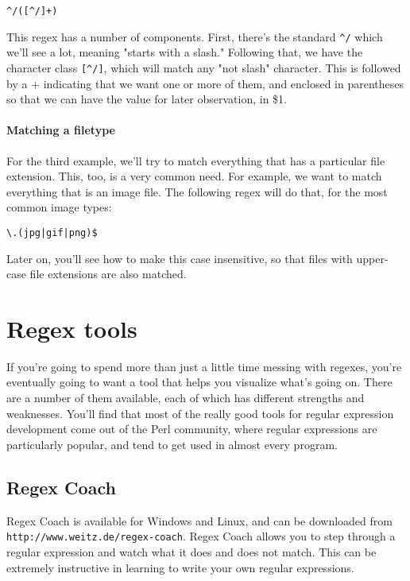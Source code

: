 \verb=^/([^/]+)=

This regex has a number of components. First, there's the standard \verb=^/= which we'll see a 
lot, meaning "starts with a slash." Following that, we have the character class \verb=[^/]=, which will 
match any "not slash" character. This is followed by a + indicating that we want one or more 
of them, and enclosed in parentheses so that we can have the value for later observation, in 
\$1.

\subsubsection{Matching a filetype}

For the third example, we'll try to match everything that has a particular file extension. 
This, too, is a very common need. For example, we want to match everything that is an image 
file. The following regex will do that, for the most common image types:

\verb#\.(jpg|gif|png)$#

Later on, you'll see how to make this case insensitive, so that files with upper-case file 
extensions are also matched.

\chapter{Regex tools}

If you're going to spend more than just a little time messing with regexes, you're 
eventually going to want a tool that helps you visualize what's going on. There are a number 
of them available, each of which has different strengths and weaknesses. You'll find that 
most of the really good tools for regular expression development come out of the Perl 
community, where regular expressions are particularly popular, and tend to get used in 
almost every program.

\section{Regex Coach}
\label{regexcoach}

Regex Coach is available for Windows and Linux, 
and can be downloaded from \verb=http://www.weitz.de/regex-coach=. 
Regex Coach allows you to step through a regular expression and watch
what it does and does not match. This can be extremely instructive in
learning to write your own regular expressions.


